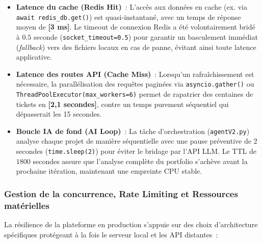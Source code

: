 \begin{itemize}
    \renewcommand{\labelitemi}{—}
    \item \textbf{Latence du cache (Redis Hit)}~: L’accès aux données en cache (ex. via \texttt{await redis\_db.get()}) est quasi‑instantané, avec un temps de réponse moyen de \textbf{[3 ms]}. Le timeout de connexion Redis a été volontairement bridé à $0.5$ seconde (\texttt{socket\_timeout=0.5}) pour garantir un basculement immédiat (\textit{fallback}) vers des fichiers locaux en cas de panne, évitant ainsi toute latence applicative.
    
    \item \textbf{Latence des routes API (Cache Miss)}~: Lorsqu’un rafraîchissement est nécessaire, la parallélisation des requêtes paginées via \texttt{asyncio.gather()} ou \texttt{ThreadPoolExecutor(max\_workers=6)} permet de rapatrier des centaines de tickets en \textbf{[2,1 secondes]}, contre un temps purement séquentiel qui dépasserait les 15 secondes.
    
    \item \textbf{Boucle IA de fond (AI Loop)}~: La tâche d’orchestration (\texttt{agentV2.py}) analyse chaque projet de manière séquentielle avec une pause préventive de 2 secondes (\texttt{time.sleep(2)}) pour éviter le bridage par l’API LLM. Le TTL de $1800$ secondes assure que l’analyse complète du portfolio s’achève avant la prochaine itération, maintenant une empreinte CPU stable.
\end{itemize}

\subsubsection{Gestion de la concurrence, Rate Limiting et Ressources matérielles}

La résilience de la plateforme en production s’appuie sur des choix d’architecture spécifiques protégeant à la fois le serveur local et les API distantes~:

